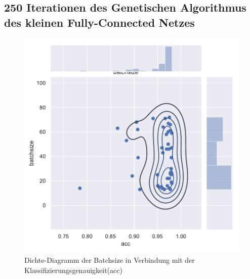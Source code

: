 \subsection{250 Iterationen des Genetischen Algorithmus des kleinen Fully-Connected Netzes}
\begin{figure}[H]
  \centering  
  \includegraphics[scale=0.5]{anhang/GA_250_mnist_digits_False_small_jointplot_batchsize.pdf}
  \caption{Dichte-Diagramm der Batchsize in Verbindung mit der Klassifizierungsgenauigkeit(acc)}
  
\end{figure}

